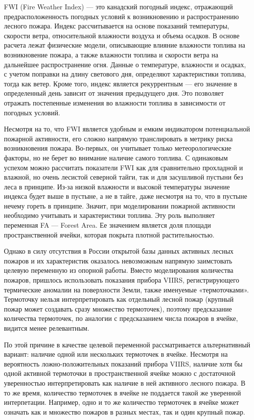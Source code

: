 \documentclass[a4paper,article,14pt]{extarticle}
\begin{document}
FWI (Fire Weather Index) — это канадский погодный индекс, отражающий предрасположенность погодных условий к возникновению и распространению лесного пожара. Индекс рассчитывается на основе показаний температуры, скорости ветра, относительной влажности воздуха и объема осадков. В основе расчета лежат физические модели, описывающие влияние влажности топлива на возникновение пожара, а также влажности топлива и скорости ветра на дальнейшее  распространение огня. Данные о температуре, влажности и осадках, с учетом поправки на длину светового дня, определяют характеристики топлива, тогда как ветер. Кроме того, индекс является рекуррентным — его значение в определенный день зависит от значения предыдущего дня. Это позволяет отражать постепенные изменения во влажности топлива в зависимости от погодных условий.

Несмотря на то, что FWI является удобным и емким индикатором потенциальной пожарной активности, его сложно напрямую транслировать в метрику риска возникновения пожара. Во-первых, он учитывает только метеорологические факторы, но не берет во внимание наличие самого топлива. С одинаковым успехом можно рассчитать показатели FWI как для сравнительно прохладной и влажной, но очень лесистой северной тайги, так и для засушливой пустыни без леса в принципе. Из-за низкой влажности и высокой температуры значение индекса будет выше в пустыне, а не в тайге, даже несмотря на то, что в пустыне нечему гореть в принципе. Значит, при моделировании пожарной активности необходимо учитывать и характеристики топлива. Эту роль выполняет переменная FA — Forest Area. Ее значением является доля площади пространственной ячейки, которая покрыта плотной растительностью.

Однако в силу отсутствия в России открытой базы данных активных лесных пожаров и их характеристик оказалось невозможным напрямую заимстовать целевую переменную из опорной работы. Вместо моделирования количества пожаров, пришлось использовать показания прибора VIIRS, регистрирующего термические аномалии на поверхности Земли, также именуемые «термоточками». Термоточку нельзя интерпретировать как отдельный лесной пожар (крупный пожар может создавать сразу множество термоточек), поэтому предсказание количества термоточек, по аналогии с предсказанием числа пожаров в ячейке, видится менее релевантным.

По этой причине в качестве целевой переменной рассматривается альтернативный вариант: наличие одной или нескольких термоточек в ячейке. Несмотря на вероятность ложно-положительных показаний прибора VIIRS, наличие хотя бы одной активной термоточки в пространственной ячейке можно с достаточной уверенностью интерпретировать как наличие в ней активного лесного пожара. В то же время, количество термоточек в ячейке не поддается такой же уверенной интерпетации. Например, одно и то же количество термоточек в ячейке может означать как и множество пожаров в разных местах, так и один крупный пожар. 
\end{document}
